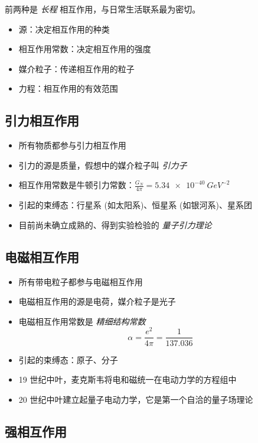 前两种是 \emph{长程} 相互作用，与日常生活联系最为密切。

\begin{itemize}
    \item 源：决定相互作用的种类
    \item 相互作用常数：决定相互作用的强度
    \item 媒介粒子：传递相互作用的粒子
    \item 力程：相互作用的有效范围
\end{itemize}

\subsection{引力相互作用}

\begin{itemize}
    \item 所有物质都参与引力相互作用
    \item 引力的源是质量，假想中的媒介粒子叫 \emph{引力子}
    \item 相互作用常数是牛顿引力常数：$\frac{G_N}{4\pi}=\qty{5.34e-40}{GeV^{-2}}$
    \item 引起的束缚态：行星系 (如太阳系)、恒星系 (如银河系)、星系团
    \item 目前尚未确立成熟的、得到实验检验的 \emph{量子引力理论}
\end{itemize}

\subsection{电磁相互作用}

\begin{itemize}
    \item 所有带电粒子都参与电磁相互作用
    \item 电磁相互作用的源是电荷，媒介粒子是光子
    \item 电磁相互作用常数是 \emph{精细结构常数}
        \begin{equation}
            \alpha = \frac{e^2}{4\pi} = \frac{1}{137.036}
        \end{equation}
    \item 引起的束缚态：原子、分子
    \item 19 世纪中叶，麦克斯韦将电和磁统一在电动力学的方程组中
    \item 20 世纪中叶建立起量子电动力学，它是第一个自洽的量子场理论
\end{itemize}

\subsection{强相互作用}

